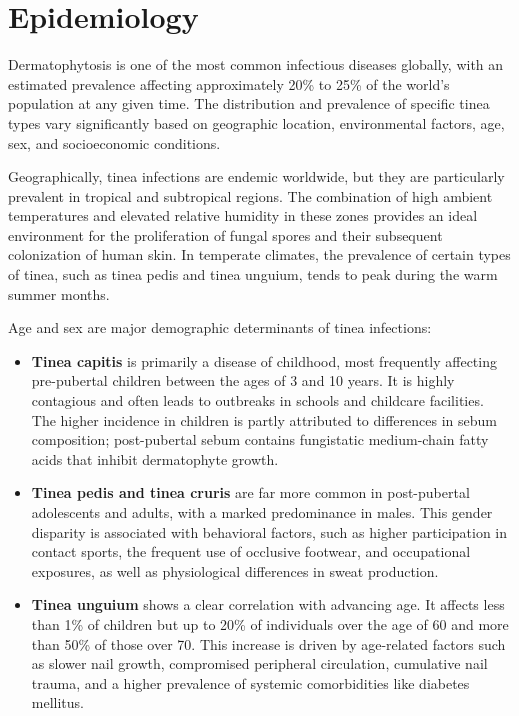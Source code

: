 \section*{Epidemiology}
Dermatophytosis is one of the most common infectious diseases globally, with an estimated prevalence affecting approximately 20\% to 25\% of the world's population at any given time. The distribution and prevalence of specific tinea types vary significantly based on geographic location, environmental factors, age, sex, and socioeconomic conditions.

Geographically, tinea infections are endemic worldwide, but they are particularly prevalent in tropical and subtropical regions. The combination of high ambient temperatures and elevated relative humidity in these zones provides an ideal environment for the proliferation of fungal spores and their subsequent colonization of human skin. In temperate climates, the prevalence of certain types of tinea, such as tinea pedis and tinea unguium, tends to peak during the warm summer months.

Age and sex are major demographic determinants of tinea infections:
\begin{itemize}
    \item \textbf{Tinea capitis} is primarily a disease of childhood, most frequently affecting pre-pubertal children between the ages of 3 and 10 years. It is highly contagious and often leads to outbreaks in schools and childcare facilities. The higher incidence in children is partly attributed to differences in sebum composition; post-pubertal sebum contains fungistatic medium-chain fatty acids that inhibit dermatophyte growth.
    \item \textbf{Tinea pedis and tinea cruris} are far more common in post-pubertal adolescents and adults, with a marked predominance in males. This gender disparity is associated with behavioral factors, such as higher participation in contact sports, the frequent use of occlusive footwear, and occupational exposures, as well as physiological differences in sweat production.
    \item \textbf{Tinea unguium} shows a clear correlation with advancing age. It affects less than 1\% of children but up to 20\% of individuals over the age of 60 and more than 50\% of those over 70. This increase is driven by age-related factors such as slower nail growth, compromised peripheral circulation, cumulative nail trauma, and a higher prevalence of systemic comorbidities like diabetes mellitus.
\end{itemize}

